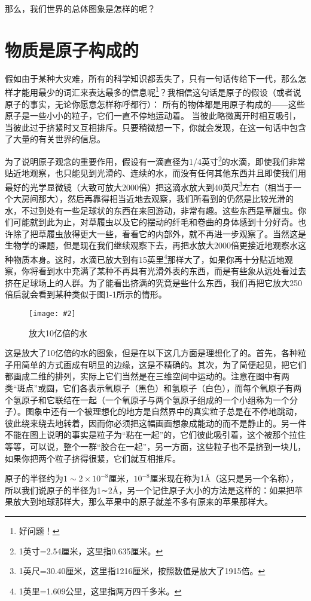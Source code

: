 \documentclass[12pt,oneside]{book}
\newenvironment{fig}[2][1]
{\begin{figure}[H]
\centering
\texttt{[image: \#2]}}
{\end{figure}}
\begin{document}
那么，我们世界的总体图象是怎样的呢？


\section{物质是原子构成的}
假如由于某种大灾难，所有的科学知识都丢失了，只有一句话传给下一代，那么怎样才能用最少的词汇来表达最多的信息呢\footnote{好问题！}？我相信这句话是原子的假设（或者说原子的事实，无论你愿意怎样称呼都行）： 所有的物体都是用原子构成的——这些原子是一些小小的粒子，它们一直不停地运动着。 当彼此略微离开时相互吸引， 当彼此过于挤紧时又互相排斥。只要稍微想一下，你就会发现，在这一句话中包含了大量的有关世界的信息。

为了说明原子观念的重要作用，假设有一滴直径为1/4英寸\footnote{1英寸=2.54厘米，这里指0.635厘米。}的水滴，即使我们非常贴近地观察，也只能见到光滑的、连续的水，而没有任何其他东西并且即使我们用最好的光学显微镜（大致可放大2000倍）把这滴水放大到40英尺\footnote{1英尺=30.40厘米，这里指1216厘米，按照数值是放大了1915倍。}左右（相当于一个大房间那大），然后再靠得相当近地去观察，我们所看到的仍然是比较光滑的水，不过到处有一些足球状的东西在来回游动，非常有趣。这些东西是草履虫。你们可能就到此为止，对草履虫以及它的摆动的纤毛和卷曲的身体感到十分好奇。也许除了把草履虫放得更大一些，看看它的内部外，就不再进一步观察了。当然这是生物学的课题，但是现在我们继续观察下去，再把水放大2000倍更接近地观察水这种物质本身。这时，水滴已放大到有15英里\footnote{1英里=1.609公里，这里指两万四千多米。}那样大了，如果你再十分贴近地观察，你将看到水中充满了某种不再具有光滑外表的东西，而是有些象从远处看过去挤在足球场上的人群。为了能看出挤满的究竟是些什么东西，我们再把它放大250倍后就会看到某种类似于图1-1所示的情形。
\begin{fig}{放大10亿倍的水}
\caption{放大10亿倍的水}
\label{fig:放大10亿倍的水}
\end{fig}
这是放大了10亿倍的水的图象，但是在以下这几方面是理想化了的。首先，各种粒子用简单的方式画成有明显的边缘，这是不精确的。其次，为了简便起见，把它们都画成二维的排列，实际上它们当然是在三维空间中运动的。注意在图中有两类“斑点”或圆，它们各表示氧原子（黑色）和氢原子（白色），而每个氧原子有两个氢原子和它联结在一起（一个氧原子与两个氢原子组成的一个小组称为一个分子）。图象中还有一个被理想化的地方是自然界中的真实粒子总是在不停地跳动，彼此绕来绕去地转着，因而你必须把这幅画面想象成能动的而不是静止的。另一件不能在图上说明的事实是粒子为“粘在一起”的，它们彼此吸引着，这个被那个拉住等等，可以说，整个一群“胶合在一起”，另一方面，这些粒子也不是挤到一块儿，如果你把两个粒子挤得很紧，它们就互相推斥。

原子的半径约为$1\sim2\times10^{-8}$厘米，$ 10^{-8} $厘米现在称为1Å（这只是另一个名称），所以我们说原子的半径为1∼2Å，另一个记住原子大小的方法是这样的：如果把苹果放大到地球那样大，那么苹果中的原子就差不多有原来的苹果那样大。
\end{document}
